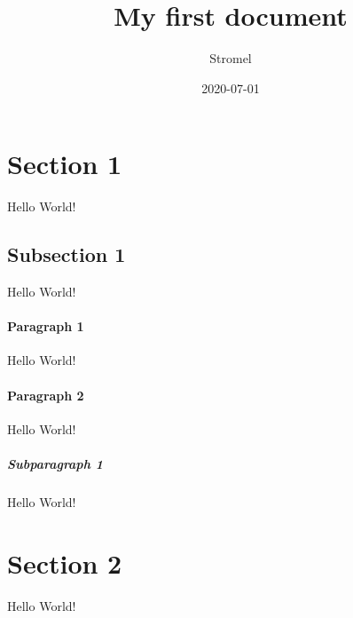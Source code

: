 \documentclass{article}
\title{My first document}
\date{2020-07-01}
\author{Stromel}
\begin{document}
	\maketitle
	\newpage
	
	\section{Section 1}
		Hello World!	
	
	\subsection{Subsection 1}
		Hello World!
	
		\paragraph{Paragraph 1}
			Hello World!
		
		\paragraph{Paragraph 2}
			Hello World!
			
			\subparagraph{Subparagraph 1}
				Hello World!
	
	\section{Section 2}
		Hello World!
\end{document}
